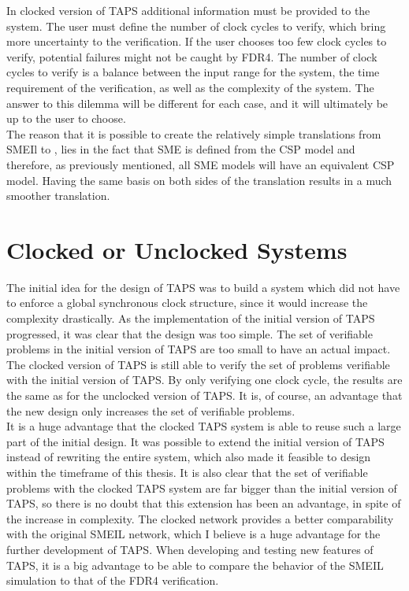 In clocked version of TAPS additional information must be provided to the system. The user must define the number of clock cycles to verify, which bring more uncertainty to the verification. If the user chooses too few clock cycles to verify, potential failures might not be caught by FDR4. The number of clock cycles to verify is a balance between the input range for the system, the time requirement of the verification, as well as the complexity of the system.
The answer to this dilemma will be different for each case, and it will ultimately be up to the user to choose. \\

The reason that it is possible to create the relatively simple translations from SMEIl to \cspm{}, lies in the fact that SME is defined from the CSP model and therefore, as previously mentioned, all SME models will have an equivalent CSP model. Having the same basis on both sides of the translation results in a much smoother translation.

\section{Clocked or Unclocked \cspm{} Systems}
The initial idea for the design of TAPS was to build a system which did not have to enforce a global synchronous clock structure, since it would increase the complexity drastically. As the implementation of the initial version of TAPS progressed, it was clear that the design was too simple. The set of verifiable problems in the initial version of TAPS are too small to have an actual impact.
The clocked version of TAPS is still able to verify the set of problems verifiable with the initial version of TAPS. By only verifying one clock cycle, the results are the same as for the unclocked version of TAPS. It is, of course, an advantage that the new design only increases the set of verifiable problems. \\

It is a huge advantage that the clocked TAPS system is able to reuse such a large part of the initial design. It was possible to extend the initial version of TAPS instead of rewriting the entire system, which also made it feasible to design within the timeframe of this thesis.
It is also clear that the set of verifiable problems with the clocked TAPS system are far bigger than the initial version of TAPS, so there is no doubt that this extension has been an advantage, in spite of the increase in complexity.
The clocked \cspm{} network provides a better comparability with the original SMEIL network, which I believe is a huge advantage for the further development of TAPS. When developing and testing new features of TAPS, it is a big advantage to be able to compare the behavior of the SMEIL simulation to that of the FDR4 verification. \\

